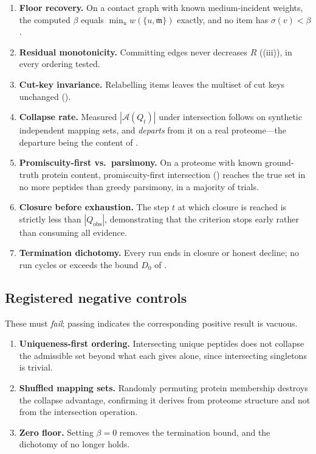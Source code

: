 \documentclass[11pt,a4paper]{article}
\theoremstyle{definition}
\theoremstyle{remark}
\newcommand{\wt}{w}                          %
\newcommand{\med}{\mathfrak{m}}              %
\newcommand{\flo}{\beta}                     %
\newcommand{\sep}{\sigma}                    %
\newcommand{\resid}{R}                       %
\newcommand{\amb}{\mathcal{A}}               %
\newcommand{\dem}{D}
\begin{document}
\begin{enumerate}[label=\textbf{E\arabic*.},leftmargin=2.6em,itemsep=2pt]
  \item \textbf{Floor recovery.} On a contact graph with known
  medium-incident weights, the computed $\flo$ equals
  $\min_u \wt(\{u,\med\})$ exactly, and no item has $\sep(v)<\flo$.
  \item \textbf{Residual monotonicity.} Committing edges never decreases
  $\resid$ ((iii)), in every ordering tested.
  \item \textbf{Cut-key invariance.} Relabelling items leaves the
  multiset of cut keys unchanged ().
  \item \textbf{Collapse rate.} Measured
  $|\amb(Q_t)|$ under intersection follows
   on synthetic independent mapping sets, and
  \emph{departs} from it on a real proteome---the departure being the
  content of .
  \item \textbf{Promiscuity-first vs.\ parsimony.} On a proteome with
  known ground-truth protein content, promiscuity-first intersection
  () reaches the true set in no more peptides than
  greedy parsimony, in a majority of trials.
  \item \textbf{Closure before exhaustion.} The step $t$ at which
  closure is reached is strictly less than $|Q_{\mathrm{obs}}|$,
  demonstrating that the criterion stops early rather than consuming all
  evidence.
  \item \textbf{Termination dichotomy.} Every run ends in closure or
  honest decline; no run cycles or exceeds the bound $\dem_0$ of
  .
\end{enumerate}

\subsection{Registered negative controls}

These must \emph{fail}; passing indicates the corresponding positive
result is vacuous.

\begin{enumerate}[label=\textbf{N\arabic*.},leftmargin=2.6em,itemsep=2pt]
  \item \textbf{Uniqueness-first ordering.} Intersecting unique peptides
  does not collapse the admissible set beyond what each gives alone,
  since intersecting singletons is trivial.
  \item \textbf{Shuffled mapping sets.} Randomly permuting protein
  membership destroys the collapse advantage, confirming it derives from
  proteome structure and not from the intersection operation.
  \item \textbf{Zero floor.} Setting $\flo=0$ removes the termination
  bound, and the dichotomy of  no longer holds.
\end{enumerate}
\end{document}

